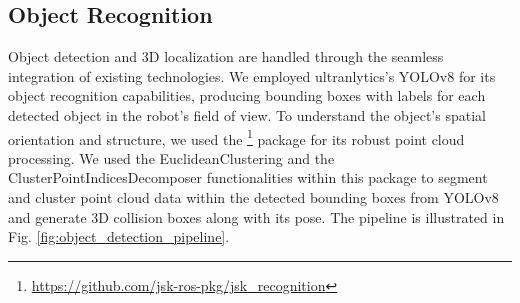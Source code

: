 \documentclass[runningheads,a4paper]{llncs}
\begin{document}
\subsection{Object Recognition}
Object detection and 3D localization are handled through the seamless integration of existing technologies.
We employed ultranlytics’s YOLOv8\cite{yolov8_ultralytics} for its object recognition capabilities, producing bounding boxes with labels for each detected object in the robot’s field of view.
To understand the object’s spatial orientation and structure, we used the \footnote{\url{https://github.com/jsk-ros-pkg/jsk\_recognition}} package for its robust point cloud processing.
We used the EuclideanClustering and the ClusterPointIndicesDecomposer functionalities within this package to segment and cluster point cloud data within the detected bounding boxes from YOLOv8 and generate 3D collision boxes along with its pose.
The pipeline is illustrated in Fig. \ref{fig:object_detection_pipeline}.
\end{document}
